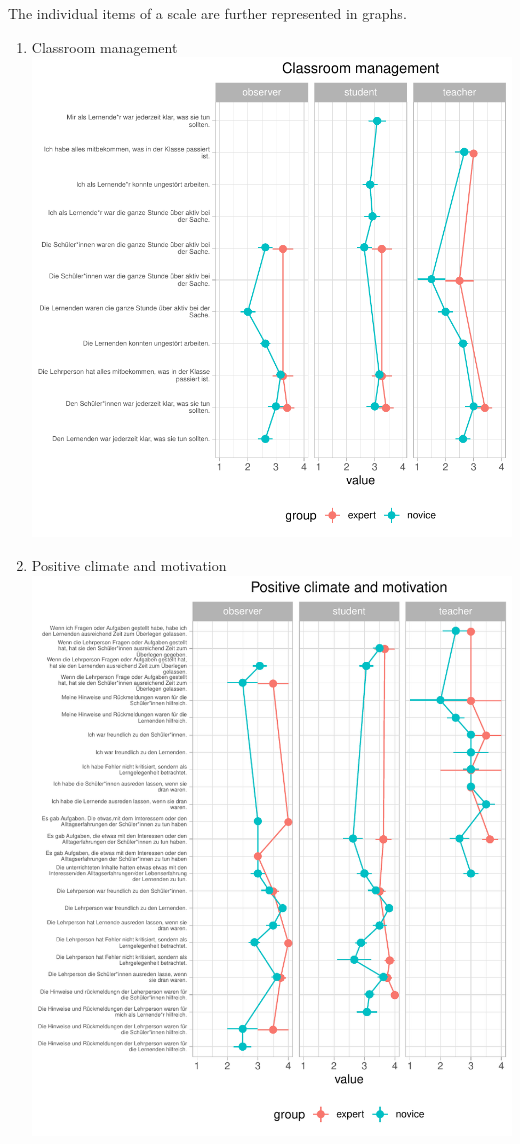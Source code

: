 \documentclass[
  english,
  man,floatsintext]{apa6}
\providecommand{\tightlist}{%
  \setlength{\itemsep}{0pt}\setlength{\parskip}{0pt}}
\begin{document}
\newpage

The individual items of a scale are further represented in graphs.

\begin{enumerate}
\def\labelenumi{(\arabic{enumi})}
\tightlist
\item
  Classroom management
  \includegraphics{paper_1_supplement_files/figure-latex/classroom management line plots-1.pdf}
  \newpage
\item
  Positive climate and motivation
  \includegraphics{paper_1_supplement_files/figure-latex/Positive climate and motivation line plots-1.pdf}

\end{enumerate}
\end{document}
